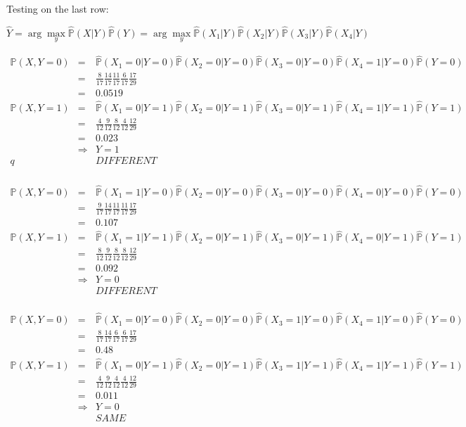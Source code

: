 \documentclass[12pt]{article}
\begin{document}
Testing on the last row:

$$\hat{Y} 
= \arg \max_y \hat{\mathbb{P}}(X|Y) \hat{\mathbb{P}}(Y)
= \arg \max_y \hat{\mathbb{P}}(X_1|Y) 
\hat{\mathbb{P}}(X_2|Y) \hat{\mathbb{P}}(X_3|Y) \hat{\mathbb{P}}(X_4|Y)$$

\begin{eqnarray*}
  \mathbb{P}(X, Y=0)
	&=& \hat{\mathbb{P}}(X_1=0|Y=0) \hat{\mathbb{P}}(X_2=0|Y=0)
	  \hat{\mathbb{P}}(X_3=0|Y=0) \hat{\mathbb{P}}(X_4=1|Y=0) \hat{\mathbb{P}}(Y=0)\\
	&=& \frac{8}{17} \frac{14}{17} \frac{11}{17} \frac{6}{17} \frac{17}{29}\\
	&=& 0.0519\\ 
  \mathbb{P}(X, Y=1)
	&=& \hat{\mathbb{P}}(X_1=0|Y=1) \hat{\mathbb{P}}(X_2=0|Y=1)
	  \hat{\mathbb{P}}(X_3=0|Y=1) \hat{\mathbb{P}}(X_4=1|Y=1) \hat{\mathbb{P}}(Y=1)\\
	&=& \frac{4}{12} \frac{9}{12} \frac{8}{12} \frac{4}{12} \frac{12}{29} \\
	&=& 0.023 \\
	&\Rightarrow& Y= 1\\q
	&& DIFFERENT \\ 
\end{eqnarray*}


\begin{eqnarray*}
  \mathbb{P}(X, Y=0)
	&=& \hat{\mathbb{P}}(X_1=1|Y=0) \hat{\mathbb{P}}(X_2=0|Y=0)
	  \hat{\mathbb{P}}(X_3=0|Y=0) \hat{\mathbb{P}}(X_4=0|Y=0) \hat{\mathbb{P}}(Y=0)\\
	&=& \frac{9}{17} \frac{14}{17} \frac{11}{17} \frac{11}{17} \frac{17}{29} \\
	&=& 0.107 \\ 
  \mathbb{P}(X, Y=1)
	&=& \hat{\mathbb{P}}(X_1=1|Y=1) \hat{\mathbb{P}}(X_2=0|Y=1)
	  \hat{\mathbb{P}}(X_3=0|Y=1) \hat{\mathbb{P}}(X_4=0|Y=1) \hat{\mathbb{P}}(Y=1)\\
	&=& \frac{8}{12} \frac{9}{12} \frac{8}{12} \frac{8}{12} \frac{12}{29} \\
	&=& 0.092 \\
	&\Rightarrow& Y=0\\ 
	&& DIFFERENT \\
\end{eqnarray*}

\begin{eqnarray*}
  \mathbb{P}(X, Y=0)
	&=& \hat{\mathbb{P}}(X_1=0|Y=0) \hat{\mathbb{P}}(X_2=0|Y=0)
	  \hat{\mathbb{P}}(X_3=1|Y=0) \hat{\mathbb{P}}(X_4=1|Y=0) \hat{\mathbb{P}}(Y=0)\\
	&=& \frac{8}{17} \frac{14}{17} \frac{6}{17} \frac{6}{17} \frac{17}{29} \\
	&=& 0.48  \\ 
  \mathbb{P}(X, Y=1)
	&=& \hat{\mathbb{P}}(X_1=0|Y=1) \hat{\mathbb{P}}(X_2=0|Y=1)
	  \hat{\mathbb{P}}(X_3=1|Y=1) \hat{\mathbb{P}}(X_4=1|Y=1) \hat{\mathbb{P}}(Y=1)\\
	&=& \frac{4}{12} \frac{9}{12} \frac{4}{12} \frac{4}{12} \frac{12}{29} \\
	&=& 0.011\\
	&\Rightarrow& Y=0\\ 
	&& SAME \\
\end{eqnarray*}
\end{document}
